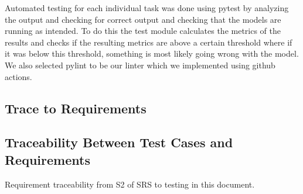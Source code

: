 \documentclass[12pt, titlepage]{article}
\begin{document}
Automated testing for each individual task was done using pytest by analyzing the output and checking for correct output and checking that the models are running as intended. To do this the test module calculates the metrics of the results and checks if the resulting metrics are above a certain threshold where if it was below this threshold, something is most likely going wrong with the model. We also selected pylint to be our linter which we implemented using github actions.




\begin{landscape}
\section{Trace to Requirements}
   \subsection{Traceability Between Test Cases and Requirements}


   Requirement traceability from S2 of SRS to testing in this document.



\end{landscape}
\end{document}

